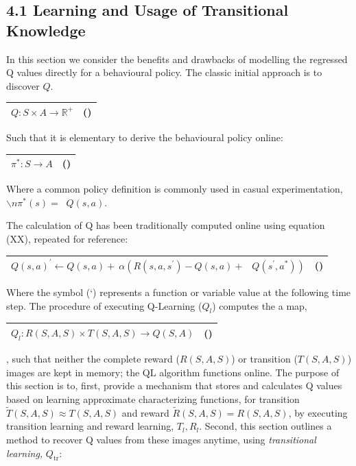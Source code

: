 \documentclass[]{article}
\begin{document}
\subsection{4.1 Learning and Usage of Transitional
Knowledge}\label{learning-and-usage-of-transitional-knowledge}

In this section we consider the benefits and drawbacks of modelling the
regressed Q values directly for a behavioural policy. The classic
initial approach is to discover \(Q\).

\begin{longtable}[]{@{}ll@{}}
\toprule
\(Q:S \times A \rightarrow \mathbb{R}^{+}\) & ()\tabularnewline
\bottomrule
\end{longtable}

Such that it is elementary to derive the behavioural policy online:

\begin{longtable}[]{@{}ll@{}}
\toprule
\(\pi^{*}:S \rightarrow A\) & ()\tabularnewline
\bottomrule
\end{longtable}

Where a common policy definition is commonly used in casual
experimentation, \(\backslash n\pi^{*}(s) = \operatorname{}{Q(s,a)}\).

The calculation of Q has been traditionally computed online using
equation (XX), repeated for reference:

\begin{longtable}[]{@{}ll@{}}
\toprule
\({Q(s,a)}^{'} \leftarrow Q(s,a) + \ \alpha\left( R\left( s,a,s^{'} \right) - Q\left( s,a \right) + \ \operatorname{}{Q(s^{'},a^{*})} \right)\)
& ()\tabularnewline
\bottomrule
\end{longtable}

Where the symbol (`) represents a function or variable value at the
following time step. The procedure of executing Q-Learning (\(Q_{l}\))
computes the a map,

\begin{longtable}[]{@{}ll@{}}
\toprule
\(Q_{l}:R(S,A,S) \times T(S,A,S) \rightarrow Q(S,A)\) &
()\tabularnewline
\bottomrule
\end{longtable}

, such that neither the complete reward (\(R(S,A,S)\)) or transition
(\(T(S,A,S)\)) images are kept in memory; the \(\text{QL}\) algorithm
functions \(\text{online}\). The purpose of this section is to, first,
provide a mechanism that stores and calculates Q values based on
learning approximate characterizing functions, for transition
\(\tilde{T}(S,A,S) \approx T(S,A,S)\) and reward
\(\tilde{R}\left( S,A,S \right) = R(S,A,S)\), by executing transition
learning and reward learning, \(T_{l},R_{l}\). Second, this section
outlines a method to recover Q values from these images anytime, using
\emph{transitional learning,} \(Q_{\text{tr}}\):
\end{document}

